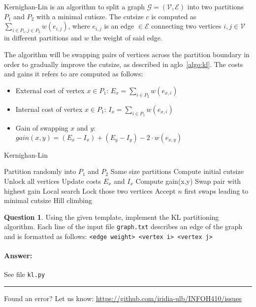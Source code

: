 \documentclass[11pt,a4paper]{article}
\theoremstyle{definition}%
\newtheorem{Q}{Question}[] %
\newcommand{\reponse}[1]{%
\ifthenelse {\boolean{corrige}} {\paragraph{Answer:} \color{darkblue}   #1\color{black}} {}
}
\begin{document}
Kernighan-Lin is an algorithm to split a graph $\mathcal{G} = (\mathcal{V}, \mathcal{E})$ into two partitions $P_1$ and $P_2$ with a minimal cutisze. The cutsize $c$ is computed as $\sum_{i \in P_1, j \in P_2} w(e_{i,j})$, where $e_{i,j}$ is an edge $\in \mathcal{E}$ connecting two vertices $i, j \in \mathcal{V}$ in different partitions and $w$ the weight of said edge.

The algorithm will be swapping pairs of vertices across the partition boundary in order to gradually improve the cutsize, as described in aglo~\ref{algo:kl}.
The costs and gains it refers to are computed as follows:
\begin{itemize}
    \item External cost of vertex $x \in P_1$: $E_x = \sum_{i\in P_2}w(e_{x,i})$
    \item Internal cost of vertex $x \in P_1$: $I_x = \sum_{i\in P_1}w(e_{x,i})$
    \item Gain of swapping $x$ and $y$: $gain(x,y) = (E_x - I_x) + (E_y - I_y) - 2\cdot w(e_{x,y})$
\end{itemize}

\begin{algorithm}
\caption{Kernighan-Lin}
\label{algo:kl}
\begin{algorithmic}[1]
    \State Partition randomly into $P_1$ and $P_2$
    \Comment Same size partitions
    \State Compute initial cutsize
    \Repeat
        \State Unlock all vertices
        \State Update costs $E_x$ and $I_x$
                    \State Compute gain(x,y)
                \EndFor
            \EndFor
            \State Swap pair with highest gain
            \Comment Local search
            \State Lock those two vertices
        \EndWhile
        \State Accept $n$ first swaps leading to minimal cutsize
        \Comment Hill climbing
\end{algorithmic}
\end{algorithm}

\begin{Q}
Using the given template, implement the KL partitioning algorithm.
Each line of the input file \texttt{graph.txt} describes an edge of the graph and is formatted as follows: \texttt{<edge weight> <vertex i> <vertex j>}
\reponse{
    See file \texttt{kl.py}
}
\end{Q}


\noindent
\rule{\textwidth}{0.4pt}
\footnotesize{Found an error? Let us know: \url{https://github.com/iridia-ulb/INFOH410/issues}}
\end{document}
